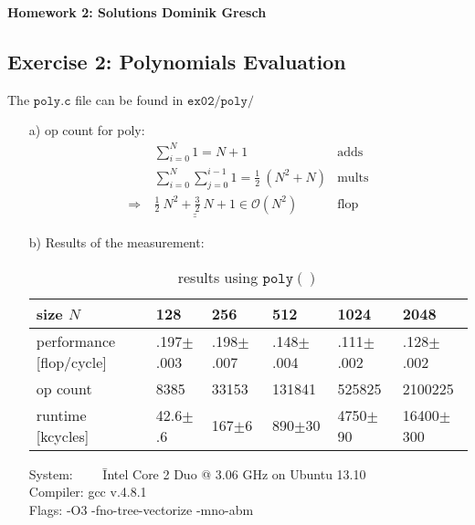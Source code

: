 \documentclass[11pt]{article}
\begin{document}
\hspace{0.2 in}
\begin{center}
	\begin{Large}
		\textbf{Homework 2: Solutions Dominik Gresch}
	\end{Large}
\end{center}

\subsection*{Exercise 2: Polynomials Evaluation}
		The $\mathtt{poly.c}$ file can be found in $\mathtt{ex02/poly/}$
	\begin{itemize}
		\item[a)] op count for poly: 
			\begin{align*}
				&\sum\limits_{i=0}^N 1 = N + 1 & \text{adds}\\
				&\sum\limits_{i=0}^N\sum\limits_{j=0}^{i - 1} 1 = \frac{1}{2}~(N^2 + N) & \text{mults}\\
				\Rightarrow ~& \underline{\underline{\frac{1}{2}~N^2 + \frac{3}{2}~N + 1}} \in \mathcal{O}(N^2) & \text{flop}
			\end{align*}
		\item[b)] Results of the measurement: 
		\begin{table}[H]
		\begin{tabular}  {l||l|l|l|l|l}
			size $N$ & 128 & 256 & 512 & 1024 & 2048\\\hline
			performance [flop/cycle] & .197$\pm$.003 & .198$\pm$.007 & .148$\pm$.004 & .111$\pm$.002 & .128$\pm$.002\\\hline
			op count & 8385 & 33153 & 131841 & 525825 & 2100225\\\hline
			runtime [kcycles] & 42.6$\pm$.6 & 167$\pm$6 & 890$\pm$30 & 4750$\pm$90 & 16400$\pm$300\\
			
		\end{tabular}
		\caption{results using $\mathtt{poly()}$}
		\end{table}
		\begin{tabbing}
			System: ~~~~\=  Intel Core 2 Duo @ 3.06 GHz on Ubuntu 13.10 \\
			Compiler: \> gcc v.4.8.1\\
			Flags:  \>-O3 -fno-tree-vectorize -mno-abm
		\end{tabbing}


\end{itemize}
\end{document}
